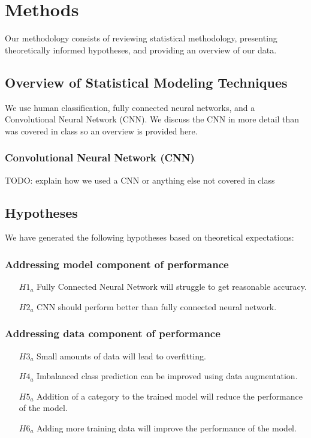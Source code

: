 \documentclass[12pt]{article}
\begin{document}
\section{Methods}

Our methodology consists of reviewing statistical methodology, presenting
theoretically informed hypotheses, and providing an overview of our data.

\subsection{Overview of Statistical Modeling Techniques}

We use human classification, fully connected neural networks,
and a Convolutional Neural Network (CNN). We discuss the CNN in
more detail than was covered in class so an overview is provided
here.

\subsubsection{Convolutional Neural Network (CNN)}

TODO: explain how we used a CNN or anything else not covered in class

\subsection{Hypotheses}

We have generated the following hypotheses based on theoretical
expectations:

\subsubsection{Addressing model component of performance}

\begin{itemize}
  \item[$H1_a$] Fully Connected Neural Network will struggle to get reasonable
    accuracy.
  \item[$H2_a$] CNN should perform better than fully connected neural network.
  \end{itemize}

\subsubsection{Addressing data component of performance}

\begin{itemize}
\item[$H3_a$] Small amounts of data will lead to overfitting.
\item[$H4_a$] Imbalanced class prediction can be improved using data
  augmentation.
\item[$H5_a$] Addition of a category to the trained model will reduce the
  performance of the model.
\item[$H6_a$] Adding more training data will improve the performance of the
  model.
\end{itemize}
\end{document}
